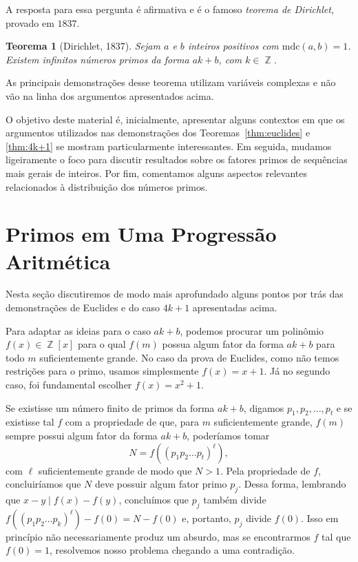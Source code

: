 \documentclass{hipatia}
\DeclareMathOperator{\Z}{\mathbb{Z}}
\newtheorem{theorem*}{Teorema}
\begin{document}
A resposta para essa pergunta é afirmativa e é o famoso \textit{teorema de Dirichlet}, provado em $1837$.

\begin{theorem*}[Dirichlet, 1837] Sejam $a$ e $b$ inteiros positivos com $\text{mdc}(a,b)=1$. Existem infinitos números primos da forma $ak+b$, com $k \in \Z$.
\end{theorem*}

As principais demonstrações desse teorema utilizam variáveis complexas e não vão na linha dos argumentos apresentados acima.

O objetivo deste material é, inicialmente, apresentar alguns contextos em que os argumentos utilizados nas demonstrações dos Teoremas~\ref{thm:euclides} e \ref{thm:4k+1} se mostram particularmente interessantes. Em seguida, mudamos ligeiramente o foco para discutir resultados sobre os fatores primos de sequências mais gerais de inteiros. Por fim, comentamos alguns aspectos relevantes relacionados à distribuição dos números primos.

\section{Primos em Uma Progressão Aritmética}

Nesta seção discutiremos de modo mais aprofundado alguns pontos por trás das demonstrações de Euclides e do caso $4k+1$ apresentadas acima. 

Para adaptar as ideias para o caso $ak+b$, podemos procurar um polinômio $f(x) \in \Z[x]$ para o qual $f(m)$ possua algum fator da forma $ak+b$ para todo $m$ suficientemente grande. No caso da prova de Euclides, como não temos restrições para o primo, usamos simplesmente $f(x)=x+1$. Já no segundo caso, foi fundamental escolher $f(x)=x^2+1$.

Se existisse um número finito de primos da forma $ak+b$, digamos $p_1, p_2, \ldots, p_t$ e se existisse tal $f$ com a propriedade de que, para $m$ suficientemente grande, $f(m)$ sempre possui algum fator da forma $ak+b$, poderíamos tomar
\[N=f((p_1p_2\ldots p_t)^\ell),\]
com $\ell$ suficientemente grande de modo que $N>1$. Pela propriedade de $f$, concluiríamos que $N$ deve possuir algum fator primo $p_j$. Dessa forma, lembrando que $x-y \mid f(x) - f(y)$, concluímos que $p_j$ também divide $f((p_1p_2\ldots p_k)^\ell)-f(0)=N-f(0)$ e, portanto, $p_j$ divide $f(0)$. Isso em princípio não necessariamente produz um absurdo, mas se encontrarmos $f$ tal que $f(0)=1$, resolvemos nosso problema chegando a uma contradição. 
\end{document}
